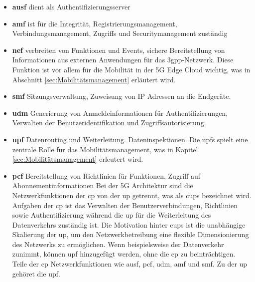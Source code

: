 \documentclass[runningheads]{llncs}
\numberwithin{figure}{section}
\begin{document}
\begin{itemize}
  \item \textbf{\acrfull{ausf}} dient als Authentifizierungsserver
  \item \textbf{\acrfull{amf}} ist für die Integrität, Registrierungsmanagement, Verbindungsmanagement,
  Zugriffs und Securitymanagement zuständig
  \item \textbf{\acrfull{nef}} verbreiten von Funktionen und Events, 
  sichere Bereitstellung von Informationen aus externen Anwendungen für das \acrshort{3gpp}-Netzwerk. Diese Funktion ist vor allem für die Mobilität
  in der 5G Edge Cloud wichtig, was in Abschnitt \ref{sec:Mobilitätsmanagement} erläutert wird.
  \item \textbf{\acrfull{smf}} Sitzungsverwaltung, Zuweisung von IP Adressen an die Endgeräte. 
  \item \textbf{\acrfull{udm}} Generierung von Anmeldeinformationen für Authentifizierungen, 
  Verwalten der Benutzeridentifikation und Zugriffsautorisierung.
  \item \textbf{\acrfull{upf}} Datenrouting und Weiterleitung. Dateninspektionen. Die \acrshort{upf}s spielt eine zentrale Rolle für das Mobilitätsmanagement, was in 
  Kapitel \ref{sec:Mobilitätsmanagement} erleutert wird.
  \item \textbf{\acrfull{pcf}} Bereitstellung von Richtlinien für Funktionen, 
  Zugriff auf Abonnementinformationen
Bei der 5G Architektur sind die Netzwerkfunktionen der \acrfull{cp} von der \acrfull{up} getrennt, was als \acrfull{cups} bezeichnet wird.
Aufgaben der \acrshort{cp} ist das Verwalten der Benutzerverbindungen, Richtlinien sowie Authentifizierung während die \acrshort{up} für die 
Weiterleitung des Datenverkehrs zuständig ist.
Die Motivation hinter \acrshort{cups} ist die unabhängige Skalierung der \acrlong{up}, um den Netzwerkbetreibung eine flexible Dimensionierung
des Netzwerks zu ermöglichen. Wenn beispielsweise der Datenverkehr zunimmt, können \acrlong{upf} hinzugefügt werden, ohne die \acrlong{cp} zu beinträchtigen.
Teile der \acrshort{cp} Netzwerkfunktionen wie \acrshort{ausf}, \acrshort{pcf}, \acrshort{udm}, \acrshort{amf} und \acrshort{smf}. 
Zu der \acrshort{up} gehöret die \acrshort{upf}. 
\end{itemize}
\end{document}
